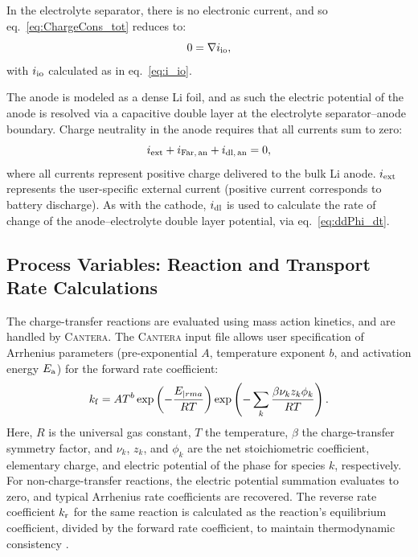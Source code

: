 \documentclass{elsarticle}
\begin{document}
In the electrolyte separator, there is no electronic current, and so eq.~\ref{eq:ChargeCons_tot} reduces to:
\begin{equation}
    0 = \nabla i_{\rm io},
\end{equation}
with $i_{\rm io}$ calculated as in eq.~\ref{eq:i_io}.

The anode is modeled as a dense Li foil, and as such the electric potential of the anode is resolved via a capacitive double layer at the electrolyte separator--anode boundary.  Charge neutrality in the anode requires that all currents sum to zero:
\begin{equation}\label{eq:ChargeConsAnode}
    i_{\rm ext} + i_{\rm Far,\,an} + i_{\rm dl,\,an} = 0,
\end{equation}
where all currents represent positive charge delivered to the bulk Li anode.  $i_{\rm ext}$ represents the user-specific external current (positive current corresponds to battery discharge).  As with the cathode, $i_{\rm dl}$ is used to calculate the rate of change of the anode--electrolyte double layer potential, via eq.~\ref{eq:ddPhi_dt}.


\subsection{Process Variables: Reaction and Transport Rate Calculations}

The charge-transfer reactions are evaluated using mass action kinetics, and are handled by \textsc{Cantera}. The \textsc{Cantera} input file allows user specification of Arrhenius parameters (pre-exponential $A$, temperature exponent $b$, and activation energy $E_{\rm a}$) for the forward rate coefficient:
\begin{equation}\label{eq:k_fwd_echem}
    k_{\rm f} = AT^b\exp\left(-\frac{E_{|rm a}}{RT}\right)\exp\left(-\sum_k\frac{\beta\nu_kz_k\phi_k}{RT}\right).
\end{equation}
Here, $R$ is the universal gas constant, $T$ the temperature, $\beta$ the charge-transfer symmetry factor, and $\nu_k$, $z_k$, and $\phi_k$ are the net stoichiometric coefficient, elementary charge, and electric potential of the phase for species $k$, respectively.  For non-charge-transfer reactions, the electric potential summation evaluates to zero, and typical Arrhenius rate coefficients are recovered.  The reverse rate coefficient $k_{\rm r}$ for the same reaction is calculated as the reaction's equilibrium coefficient, divided by the forward rate coefficient, to maintain thermodynamic consistency \cite{DeCaluwe_2018}.
\end{document}
